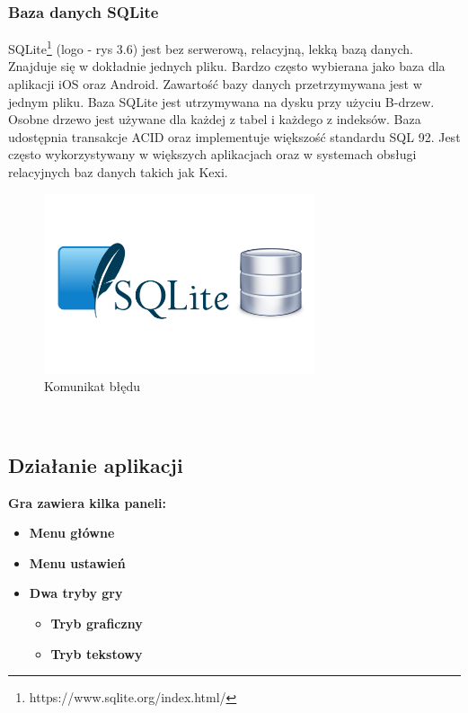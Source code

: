 \subsubsection{Baza danych SQLite}
SQLite\footnote{ https://www.sqlite.org/index.html/\cite{www6}} (logo - rys 3.6) jest bez serwerową, relacyjną, lekką bazą danych. Znajduje się w dokładnie jednych pliku. Bardzo często wybierana jako baza dla aplikacji iOS oraz Android. 
Zawartość bazy danych przetrzymywana jest w jednym pliku. Baza SQLite jest utrzymywana na dysku przy użyciu B-drzew. Osobne drzewo jest używane dla każdej z tabel i każdego z indeksów. Baza udostępnia transakcje ACID oraz implementuje większość standardu SQL 92. Jest często wykorzystywany w większych aplikacjach oraz w systemach obsługi relacyjnych baz danych takich jak Kexi.
\\
	\begin{figure}[!htb]
	\begin{center}
		\includegraphics[width=8cm]{rys/baza.png}
		\caption{Komunikat błędu}
		\label{rys:rysunek001}
	\end{center}
\end{figure}
\\
\subsection{Działanie aplikacji}
\textbf{ Gra zawiera kilka paneli: }
\begin{itemize}
	\item \textbf{Menu główne}
	\item \textbf{Menu ustawień} 
	\item   \textbf{Dwa tryby gry}
	\begin{itemize}
		\item \textbf{Tryb graficzny}
		\item \textbf{Tryb tekstowy} 
	\end{itemize}
\end{itemize}


